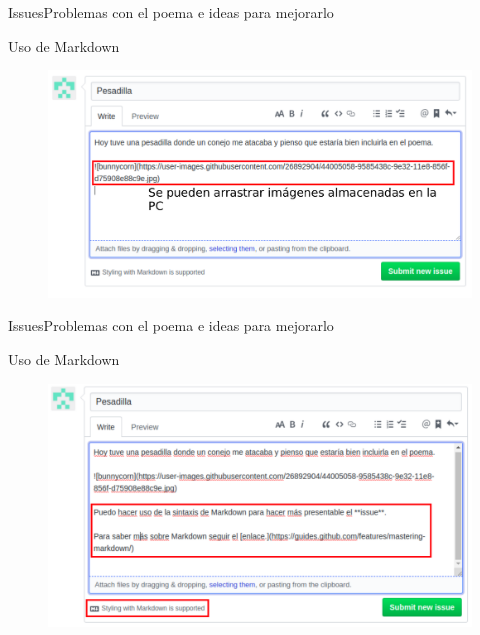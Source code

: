 \documentclass[10pt]{beamer}
\begin{document}
\begin{frame}{Issues}{Problemas con el poema e ideas para mejorarlo}

\begin{block}{Uso de Markdown}
\vspace{-0.15in}
\begin{figure}[h!]
\centering
\includegraphics [scale=0.45]{nightmare}
\label{fig:images}
\end{figure}
    
\end{block}

\end{frame}

\begin{frame}{Issues}{Problemas con el poema e ideas para mejorarlo}

\begin{block}{Uso de Markdown}
\vspace{-0.15in}
\begin{figure}[h!]
\centering
\includegraphics [scale=0.45]{markdown}
\label{fig:markdown}
\end{figure}
    
\end{block}

\end{frame}
\end{document}
